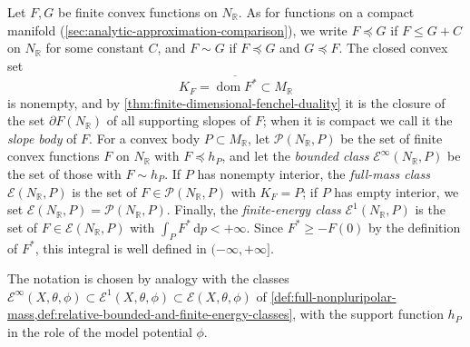 \begin{definition}\label{def:convex-growth-classes}
Let $F,G$ be finite convex functions on $N_{\mathbb R}$. As for functions on a compact manifold (\cref{sec:analytic-approximation-comparison}), we write $F\preceq G$ if $F\leq G+C$ on $N_{\mathbb R}$ for some constant $C$, and $F\sim G$ if $F\preceq G$ and $G\preceq F$. The closed convex set
\[
 K_F=\overline{\operatorname{dom}F^*}\subset M_{\mathbb R}
\]
is nonempty, and by \cref{thm:finite-dimensional-fenchel-duality} it is the closure of the set $\partial F(N_{\mathbb R})$ of all supporting slopes of $F$; when it is compact we call it the \emph{slope body} of $F$. For a convex body $P\subset M_{\mathbb R}$, let $\mathcal P(N_{\mathbb R},P)$ be the set of finite convex functions $F$ on $N_{\mathbb R}$ with $F\preceq h_P$, and let the \emph{bounded class} $\mathcal E^\infty(N_{\mathbb R},P)$ be the set of those with $F\sim h_P$. If $P$ has nonempty interior, the \emph{full-mass class} $\mathcal E(N_{\mathbb R},P)$ is the set of $F\in\mathcal P(N_{\mathbb R},P)$ with $K_F=P$; if $P$ has empty interior, we set $\mathcal E(N_{\mathbb R},P)=\mathcal P(N_{\mathbb R},P)$. Finally, the \emph{finite-energy class} $\mathcal E^1(N_{\mathbb R},P)$ is the set of $F\in\mathcal E(N_{\mathbb R},P)$ with $\int_PF^*\,\mathrm dp<+\infty$. Since $F^*\geq-F(0)$ by the definition of $F^*$, this integral is well defined in $(-\infty,+\infty]$.
\end{definition}
The notation is chosen by analogy with the classes $\mathcal E^\infty(X,\theta,\phi)\subset\mathcal E^1(X,\theta,\phi)\subset\mathcal E(X,\theta,\phi)$ of \cref{def:full-nonpluripolar-mass,def:relative-bounded-and-finite-energy-classes}, with the support function $h_P$ in the role of the model potential $\phi$.

